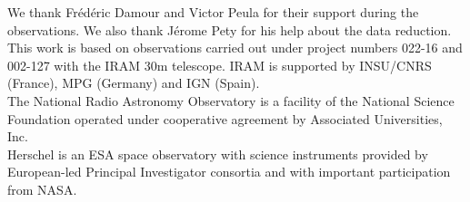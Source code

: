 \documentclass[traditabstract]{aa}
\begin{document}
%

\begin{acknowledgements}
   We thank Fr\'ed\'eric Damour and Victor Peula for their support during the observations. We also thank Jérome Pety for his help about the data reduction. \\

   This work is based on observations carried out under project numbers 022-16 and 002-127 with the IRAM 30m telescope. IRAM is supported by INSU/CNRS (France), MPG (Germany) and IGN (Spain). \\

   The National Radio Astronomy Observatory is a facility of the National Science Foundation operated under cooperative agreement by Associated Universities, Inc. \\

   Herschel is an ESA space observatory with science instruments provided by European-led Principal Investigator consortia and with important participation from NASA.
\end{acknowledgements}



\end{document}

